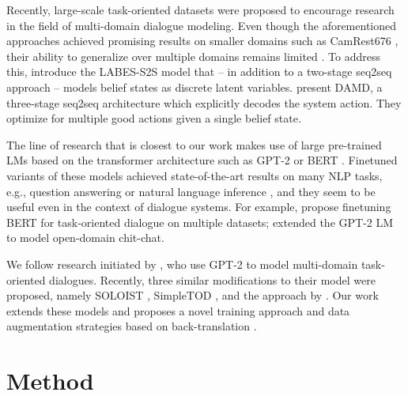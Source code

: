 \documentclass[11pt,a4paper]{article}
\begin{document}
Recently, large-scale task-oriented datasets were proposed \cite{budzianowski2018, byrne2019, rastogi2019} to encourage research in the field of multi-domain dialogue modeling. 
Even though the aforementioned approaches achieved promising results on smaller domains such as CamRest676 \cite{wen2016}, their ability to generalize over multiple domains remains limited \cite{zhang2019}. 
To address this, \citet{zhang2020end2end} introduce the LABES-S2S model that -- in addition to a two-stage seq2seq approach -- models belief states as discrete latent variables.
\citet{zhang2019} present DAMD, a three-stage seq2seq architecture which explicitly decodes the system action. They optimize for multiple good actions given a single belief state.

The line of research that is closest to our work makes use of large pre-trained LMs 
based on the transformer architecture \cite{vaswani2017} such as GPT-2 \cite{radford2019} or BERT \cite{devlin2019}. 
Finetuned variants of these models achieved state-of-the-art results on many NLP tasks, e.g., question answering or natural language inference \cite{liu2020},  
and they seem to be useful even in the context of dialogue systems. 
For example, \citet{wu2020} %
propose finetuning BERT \cite{devlin2019} for task-oriented dialogue on multiple datasets; 
\citet{zhang2020dialogpt} extended the GPT-2 LM to model open-domain chit-chat.

We follow research initiated by \citet{budzianowski2019}, who use GPT-2 to model multi-domain task-oriented dialogues.  
Recently, three similar modifications to their model were proposed, namely SOLOIST \cite{peng2020}, SimpleTOD \cite{hosseini2020}, and the approach by \citet{ham2020}. 
Our work extends these models and proposes a novel training approach and data augmentation strategies based on back-translation \cite{edunov2018,federmann2019multilingual}.

\section{Method}
\label{sec:method}
\end{document}
